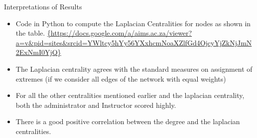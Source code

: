 \documentclass{beamer}
\begin{document}
\begin{frame}{Interpretations of Results}
\begin{block}{}
\begin{itemize}
	\item Code in Python to compute the Laplacian Centralities for nodes as shown in the table. \url{{https://docs.google.com/a/aims.ac.za/viewer?a=v&pid=sites&srcid=YWltcy5hYy56YXxhcmNoaXZlfGd4OjcyYjZkNjJmN2ExNmI0YjQ}}
	\vspace{0.5cm}
	\pause
	\item The Laplacian centrality agrees with the standard measures on assignment of extremes (if we consider all edges of the network with equal weights)
	\pause
	\item For all the other centralities mentioned earlier and the laplacian centrality, both the administrator and Instructor scored highly.
	\vspace{0.5cm}
	\pause
	\item There is a good positive correlation between the degree and the laplacian centralities.
\end{itemize}
\end{block}
\end{frame}
\end{document}
